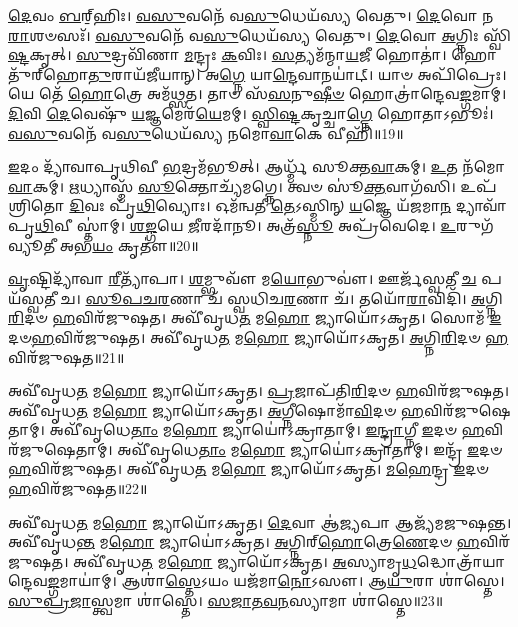 \-\ul{𑌦𑍇}\-𑌵𑌂 \ul{𑌬}\-𑌰𑍍‌॒\mbox{}𑌹𑌿𑌃।
\-\ul{𑌵}\-\-\ul{𑌸𑍁}\-𑌵𑌨𑍇᳴ 𑌵\-\ul{𑌸𑍁}\-𑌧𑍇𑌯᳴𑌸𑍍𑌯 𑌵𑍇𑌤𑍁।
\-\ul{𑌦𑍇}\-𑌵𑍋 𑌨\-\ul{𑌰𑌾}\-𑌶𑍞𑌸𑌃᳴।
\-\ul{𑌵}\-\-\ul{𑌸𑍁}\-𑌵𑌨𑍇᳴ 𑌵\-\ul{𑌸𑍁}\-𑌧𑍇𑌯᳴𑌸𑍍𑌯 𑌵𑍇𑌤𑍁।
\-\ul{𑌦𑍇}\-𑌵𑍋 \ul{𑌅}\-𑌗𑍍𑌨𑌿𑌃 𑌸𑍍𑌵𑌿᳴\-\ul{𑌷𑍍𑌟}\-𑌕𑍃𑌤𑍍।
\-\ul{𑌸𑍁}\-𑌦𑍍𑌰𑌵𑌿᳴𑌣𑌾 \ul{𑌮}\-𑌨𑍍𑌦𑍍𑌰𑌃 \ul{𑌕}\-𑌵𑌿𑌃।
\-\ul{𑌸}\-𑌤𑍍𑌯𑌮᳴𑌨𑍍𑌮𑌾\-\ul{𑌯}\-𑌜𑍀 𑌹𑍋𑌤𑌾॑।
𑌹𑍋𑌤𑍁᳴𑌰𑍍‌\mbox{}𑌹𑍋\-\ul{𑌤𑍁}\-𑌰𑌾𑌯᳴𑌜𑍀𑌯𑌾𑌨𑍍।
𑌅\-\ul{𑌗𑍍𑌨𑍇} 𑌯𑌾\-\ul{𑌨𑍍𑌦𑍇}\-𑌵𑌾𑌨𑌯𑌾॑𑌟𑍍।
𑌯𑌾𑍞 𑌅𑌪𑌿᳴𑌪𑍍𑌰𑍇𑌃।
𑌯𑍇 𑌤𑍇᳴ \ul{𑌹𑍋}\-𑌤𑍍𑌰𑍇 𑌅𑌮᳴𑌥𑍍𑌸𑌤।
𑌤𑌾𑍞 𑌸᳴\-\ul{𑌸}\-𑌨𑍁\-\ul{𑌷𑍀}\-\-\ul{𑍞} 𑌹𑍋𑌤𑍍𑌰𑌾॑𑌨𑍍𑌦𑍇𑌵\-\ul{𑌙𑍍𑌗}\-𑌮𑌾𑌮𑍍।
\-\ul{𑌦𑌿}\-𑌵𑌿 \ul{𑌦𑍇}\-𑌵𑍇𑌷𑍁᳴ \ul{𑌯}\-𑌜𑍍𑌞𑌮𑍇𑌰᳴\-\ul{𑌯𑍇}\-𑌮𑌮𑍍।
\-\ul{𑌸𑍍𑌵𑌿}\-\-\ul{𑌷𑍍𑌟}\-𑌕𑍃𑌚𑍍𑌚𑌾\-\ul{𑌗𑍍𑌨𑍇} 𑌹𑍋𑌤𑌾\-𑌽𑌭𑍂𑌃॑।
\-\ul{𑌵}\-\-\ul{𑌸𑍁}\-𑌵𑌨𑍇᳴ 𑌵\-\ul{𑌸𑍁}\-𑌧𑍇𑌯᳴𑌸𑍍𑌯 𑌨𑌮𑍋\-\ul{𑌵𑌾}\-𑌕𑍇 𑌵𑍀𑌹𑌿᳴॥19॥\anuvakamend[𑌅𑌪𑌿᳴\-\ul{𑌪𑍍𑌰𑍇𑌃} 𑌪𑌞𑍍𑌚᳴ 𑌚]

\-\ul{𑌇}\-𑌦𑌂 𑌦𑍍𑌯𑌾᳴𑌵𑌾𑌪𑍃𑌥𑌿𑌵𑍀 \ul{𑌭}\-𑌦𑍍𑌰𑌮᳴𑌭𑍂𑌤𑍍।
𑌆𑌰𑍍𑌧𑍍𑌮᳴ 𑌸𑍂𑌕𑍍𑌤\-\ul{𑌵𑌾}\-𑌕𑌮𑍍।
\-\ul{𑌉}\-𑌤 𑌨᳴𑌮𑍋\-\ul{𑌵𑌾}\-𑌕𑌮𑍍।
\-\ul{𑌋}\-𑌧𑍍𑌯𑌾𑌸𑍍𑌮᳴ \ul{𑌸𑍂}\-𑌕𑍍𑌤𑍋𑌚𑍍𑌯᳴𑌮𑌗𑍍𑌨𑍇।
𑌤𑍍𑌵𑍞 𑌸𑍂॑\-\ul{𑌕𑍍𑌤}\-𑌵𑌾𑌗᳴𑌸𑌿।
𑌉𑌪᳴𑌶𑍍𑌰𑌿𑌤𑍋 \ul{𑌦𑌿}\-𑌵𑌃 𑌪𑍃᳴\-\ul{𑌥𑌿}\-𑌵𑍍𑌯𑍋𑌃।
𑌓𑌮᳴𑌨𑍍𑌵𑌤𑍀 \ul{𑌤𑍇}\-\-𑌽𑌸𑍍𑌮𑌿𑌨𑍍 \ul{𑌯}\-𑌜𑍍𑌞𑍇 𑌯᳴𑌜𑌮𑌾\-\ul{𑌨} 𑌦𑍍𑌯𑌾𑌵𑌾᳴𑌪𑍃\-\ul{𑌥𑌿}\-𑌵𑍀 𑌸𑍍𑌤𑌾॑𑌮𑍍।
\-\ul{𑌶}\-\-\ul{𑌙𑍍𑌗}\-𑌯𑍇 \ul{𑌜𑍀}\-𑌰𑌦𑌾᳴𑌨𑍂।
𑌅𑌤𑍍𑌰᳴\-\ul{𑌸𑍍𑌨𑍂} 𑌅𑌪𑍍𑌰᳴𑌵𑍇𑌦𑍇।
\-\ul{𑌉}\-𑌰𑍁𑌗᳴𑌵𑍍𑌯𑍂𑌤𑍀 𑌅𑌭\-\ul{𑌯𑌂} 𑌕𑍃𑌤𑍗॑॥20॥

\-\ul{𑌵𑍃}\-𑌷𑍍𑌟𑌿𑌦𑍍𑌯𑌾᳴𑌵𑌾 \ul{𑌰𑍀}\-𑌤𑍍𑌯𑌾᳴𑌪𑌾।
\-\ul{𑌶}\-𑌮𑍍𑌭𑍁𑌵𑍗᳴ 𑌮\-\ul{𑌯𑍋}\-𑌭𑍁𑌵𑍗॑।
𑌊𑌰𑍍𑌜᳴𑌸𑍍𑌵𑌤𑍀 \ul{𑌚} 𑌪𑌯᳴𑌸𑍍𑌵𑌤𑍀 𑌚।
\-\ul{𑌸𑍂}\-\-\ul{𑌪}\-\-\ul{𑌚}\-\-\ul{𑌰}\-𑌣𑌾 𑌚᳴ 𑌸𑍍𑌵𑌧𑌿𑌚\-\ul{𑌰}\-𑌣𑌾 𑌚᳴।
𑌤𑌯𑍋᳴\-\ul{𑌰𑌾}\-𑌵𑌿𑌦𑌿᳴।
\-\ul{𑌅}\-𑌗𑍍𑌨𑌿\-\ul{𑌰𑌿}\-𑌦𑍞 \ul{𑌹}\-𑌵𑌿𑌰᳴𑌜𑍁𑌷𑌤।
𑌅𑌵𑍀᳴𑌵𑍃𑌧\-\ul{𑌤} 𑌮\-\ul{𑌹𑍋} 𑌜𑍍𑌯𑌾𑌯𑍋᳴𑌽𑌕𑍃𑌤।
𑌸𑍋𑌮᳴ \ul{𑌇}\-𑌦𑍞\-\ul{𑌹}\-𑌵𑌿𑌰᳴𑌜𑍁𑌷𑌤।
𑌅𑌵𑍀᳴𑌵𑍃𑌧\-\ul{𑌤} 𑌮\-\ul{𑌹𑍋} 𑌜𑍍𑌯𑌾𑌯𑍋᳴𑌽𑌕𑍃𑌤।
\-\ul{𑌅}\-𑌗𑍍𑌨𑌿\-\ul{𑌰𑌿}\-𑌦𑍞 \ul{𑌹}\-𑌵𑌿𑌰᳴𑌜𑍁𑌷𑌤॥21॥

𑌅𑌵𑍀᳴𑌵𑍃𑌧\-\ul{𑌤} 𑌮\-\ul{𑌹𑍋} 𑌜𑍍𑌯𑌾𑌯𑍋᳴𑌽𑌕𑍃𑌤।
\-\ul{𑌪𑍍𑌰}\-𑌜𑌾𑌪᳴𑌤𑌿\-\ul{𑌰𑌿}\-𑌦𑍞 \ul{𑌹}\-𑌵𑌿𑌰᳴𑌜𑍁𑌷𑌤।
𑌅𑌵𑍀᳴𑌵𑍃𑌧\-\ul{𑌤} 𑌮\-\ul{𑌹𑍋} 𑌜𑍍𑌯𑌾𑌯𑍋᳴𑌽𑌕𑍃𑌤।
\-\ul{𑌅}\-𑌗𑍍𑌨𑍀𑌷𑍋𑌮𑌾᳴\-\ul{𑌵𑌿}\-𑌦𑍞 \ul{𑌹}\-𑌵𑌿𑌰᳴𑌜𑍁𑌷𑍇𑌤𑌾𑌮𑍍।
𑌅𑌵𑍀᳴𑌵𑍃𑌧𑍇\-\ul{𑌤𑌾𑌂} 𑌮\-\ul{𑌹𑍋} 𑌜𑍍𑌯𑌾𑌯𑍋॑\-𑌽𑌕𑍍𑌰𑌾𑌤𑌾𑌮𑍍।
\-\ul{𑌇}\-\-\ul{𑌨𑍍𑌦𑍍𑌰𑌾}\-𑌗𑍍𑌨𑍀 \ul{𑌇}\-𑌦𑍞 \ul{𑌹}\-𑌵𑌿𑌰᳴𑌜𑍁𑌷𑍇𑌤𑌾𑌮𑍍।
𑌅𑌵𑍀᳴𑌵𑍃𑌧𑍇\-\ul{𑌤𑌾𑌂} 𑌮\-\ul{𑌹𑍋} 𑌜𑍍𑌯𑌾𑌯𑍋॑\-𑌽𑌕𑍍𑌰𑌾𑌤𑌾𑌮𑍍।
𑌇𑌨𑍍𑌦𑍍𑌰᳴ \ul{𑌇}\-𑌦𑍞 \ul{𑌹}\-𑌵𑌿𑌰᳴𑌜𑍁𑌷𑌤।
𑌅𑌵𑍀᳴𑌵𑍃𑌧\-\ul{𑌤} 𑌮\-\ul{𑌹𑍋} 𑌜𑍍𑌯𑌾𑌯𑍋᳴𑌽𑌕𑍃𑌤।
\-\ul{𑌮}\-\-\ul{𑌹𑍇}\-𑌨𑍍𑌦𑍍𑌰 \ul{𑌇}\-𑌦𑍞 \ul{𑌹}\-𑌵𑌿𑌰᳴𑌜𑍁𑌷𑌤॥22॥

𑌅𑌵𑍀᳴𑌵𑍃𑌧\-\ul{𑌤} 𑌮\-\ul{𑌹𑍋} 𑌜𑍍𑌯𑌾𑌯𑍋᳴𑌽𑌕𑍃𑌤।
\-\ul{𑌦𑍇}\-𑌵𑌾 𑌆॑\-\ul{𑌜𑍍𑌯}\-𑌪𑌾 𑌆𑌜𑍍𑌯᳴𑌮𑌜𑍁𑌷𑌨𑍍𑌤।
𑌅𑌵𑍀᳴𑌵𑍃𑌧\-\ul{𑌨𑍍𑌤} 𑌮\-\ul{𑌹𑍋} 𑌜𑍍𑌯𑌾𑌯𑍋॑\-𑌽𑌕𑍍𑌰𑌤।
\-\ul{𑌅}\-𑌗𑍍𑌨𑌿𑌰𑍍‌\mbox{}\-\ul{𑌹𑍋}\-𑌤𑍍𑌰𑍇\-\ul{𑌣𑍇}\-𑌦𑍞 \ul{𑌹}\-𑌵𑌿𑌰᳴𑌜𑍁𑌷𑌤।
𑌅𑌵𑍀᳴𑌵𑍃𑌧\-\ul{𑌤} 𑌮\-\ul{𑌹𑍋} 𑌜𑍍𑌯𑌾𑌯𑍋᳴𑌽𑌕𑍃𑌤।
\-\ul{𑌅}\-𑌸𑍍𑌯𑌾𑌮𑍃\-\ul{𑌧}\-𑌦𑍍𑌧𑍋𑌤𑍍𑌰𑌾᳴𑌯𑌾𑌨𑍍𑌦𑍇𑌵\-\ul{𑌙𑍍𑌗}\-𑌮𑌾𑌯𑌾॑𑌮𑍍।
𑌆𑌶𑌾॑\-\ul{𑌸𑍍𑌤𑍇}\-𑌽𑌯𑌂 𑌯𑌜᳴𑌮𑌾\-\ul{𑌨𑍋}\-𑌽𑌸𑍗।
𑌆\-\ul{𑌯𑍁}\-𑌰𑌾 𑌶𑌾॑𑌸𑍍𑌤𑍇।
\-\ul{𑌸𑍁}\-\-\ul{𑌪𑍍𑌰}\-\-\ul{𑌜𑌾}\-𑌸𑍍𑌤𑍍𑌵𑌮𑌾 𑌶𑌾॑𑌸𑍍𑌤𑍇।
\-\ul{𑌸}\-\-\ul{𑌜𑌾}\-\-\ul{𑌤}\-\-\ul{𑌵}\-\-\ul{𑌨}\-𑌸𑍍𑌯𑌾𑌮𑌾 𑌶𑌾॑𑌸𑍍𑌤𑍇॥23॥

